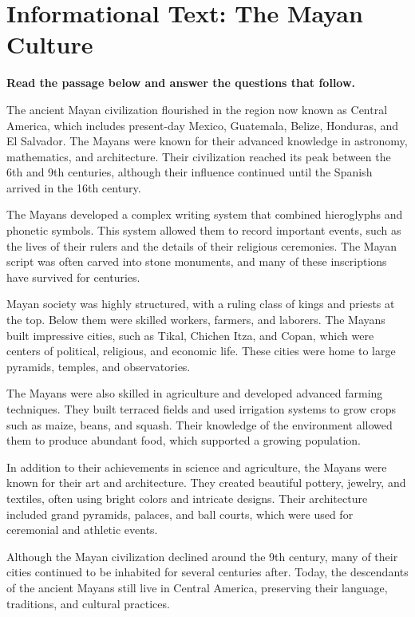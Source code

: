 \documentclass[12pt]{article}
\begin{document}
\onehalfspacing

\section*{Informational Text: The Mayan Culture}

\textbf{Read the passage below and answer the questions that follow.}

The ancient Mayan civilization flourished in the region now known as Central America, which includes present-day Mexico, Guatemala, Belize, Honduras, and El Salvador. The Mayans were known for their advanced knowledge in astronomy, mathematics, and architecture. Their civilization reached its peak between the 6th and 9th centuries, although their influence continued until the Spanish arrived in the 16th century.

The Mayans developed a complex writing system that combined hieroglyphs and phonetic symbols. This system allowed them to record important events, such as the lives of their rulers and the details of their religious ceremonies. The Mayan script was often carved into stone monuments, and many of these inscriptions have survived for centuries.

Mayan society was highly structured, with a ruling class of kings and priests at the top. Below them were skilled workers, farmers, and laborers. The Mayans built impressive cities, such as Tikal, Chichen Itza, and Copan, which were centers of political, religious, and economic life. These cities were home to large pyramids, temples, and observatories.

The Mayans were also skilled in agriculture and developed advanced farming techniques. They built terraced fields and used irrigation systems to grow crops such as maize, beans, and squash. Their knowledge of the environment allowed them to produce abundant food, which supported a growing population.

In addition to their achievements in science and agriculture, the Mayans were known for their art and architecture. They created beautiful pottery, jewelry, and textiles, often using bright colors and intricate designs. Their architecture included grand pyramids, palaces, and ball courts, which were used for ceremonial and athletic events.

Although the Mayan civilization declined around the 9th century, many of their cities continued to be inhabited for several centuries after. Today, the descendants of the ancient Mayans still live in Central America, preserving their language, traditions, and cultural practices.
\end{document}
